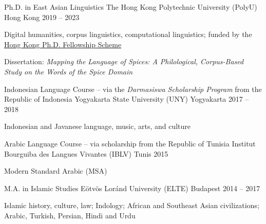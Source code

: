 
\begin{cventries}

  \cventry
    {Ph.D. in East Asian Linguistics} %
    {The Hong Kong Polytechnic University (PolyU)} %
    {Hong Kong} %
    {2019 -- 2023} %
    {
      \begin{cvitems} %
        \item {Digital humanities, corpus linguistics, computational linguistics; funded by the \href{https://cerg1.ugc.edu.hk/hkpfs/index.html}{Hong Kong Ph.D. Fellowship Scheme}}
        \item {Dissertation: \textit{Mapping the Language of Spices: A Philological, Corpus-Based Study on the Words of the Spice Domain} \href{https://partigabor.github.io/spice}{\faPaperclip}}
      \end{cvitems}
    }

    \cventry
    {Indonesian Language Course -- via the \textit{Darmasiswa Scholarship Program} from the Republic of Indonesia} %
    {Yogyakarta State University (UNY)} %
    {Yogyakarta} %
    {2017 -- 2018} %
    {
      \begin{cvitems} %
        \item {Indonesian and Javanese language, music, arts, and culture}
      \end{cvitems}
    }

  \cventry
    {Arabic Language Course -- via scholarship from the Republic of Tunisia} %
    {Institut Bourguiba des Langues Vivantes (IBLV)} %
    {Tunis} %
    {2015} %
    {
      \begin{cvitems} %
        \item {Modern Standard Arabic (MSA)}
      \end{cvitems}
    }
    
\cventry
    {M.A. in Islamic Studies} %
    {Eötvös Loránd University (ELTE)} %
    {Budapest} %
    {2014 -- 2017} %
    {
      \begin{cvitems} %
        \item {Islamic history, culture, law; Indology; African and Southeast Asian civilizations; Arabic, Turkish, Persian, Hindi and Urdu}
      \end{cvitems}
    }


\end{cventries}
